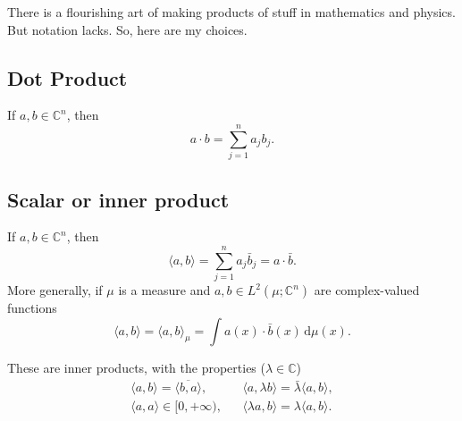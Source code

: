 \documentclass[a4paper,9pt]{amsart}
\newcommand{\C}{\mathbb{C}}	%
\newcommand{\did}{\,\mathrm{d}}	%
\theoremstyle{plain}
\theoremstyle{definition}
\theoremstyle{remark}
\begin{document}
There is a flourishing art of making products of stuff in mathematics and physics.
But notation lacks.
So, here are my choices.

\subsection{Dot Product}\label{subs6889e81a}
If $a,b\in\C^n$, then
\begin{equation}
	a\cdot b = \sum_{j=1}^n a_jb_j .
\end{equation}

\subsection{Scalar or inner product}\label{subs6889e7fa}
If $a,b\in\C^n$, then
\begin{equation}
	\langle a,b \rangle = \sum_{j=1}^n a_j\bar b_j = a\cdot \bar b .
\end{equation}
More generally, if $\mu$ is a measure and $a,b\in L^2(\mu;\C^n)$ are complex-valued functions
\begin{equation}
	\langle a,b \rangle = \langle a,b \rangle_\mu = \int a(x)\cdot \bar b(x) \did\mu(x) .
\end{equation}

These are inner products, with the properties ($\lambda\in\C$)
\begin{align}
	\langle a,b \rangle = \overline{ \langle b,a \rangle } , &&
	\langle a,\lambda b \rangle = \bar \lambda \langle a,b \rangle, \\
	\langle a,a \rangle \in[0,+\infty) , &&
	\langle \lambda a,b \rangle = \lambda \langle a,b \rangle .
\end{align}

\end{document}
